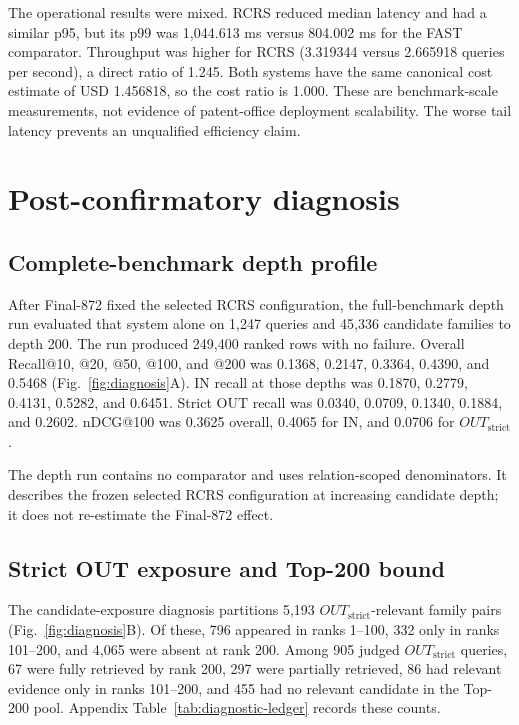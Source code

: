 \documentclass[final,5p,times,twocolumn]{elsarticle}
\newcommand{\RCRS}{RCRS}
\begin{document}
The operational results were mixed. \RCRS{} reduced median latency and had a
similar p95, but its p99 was 1,044.613 ms versus 804.002 ms for the FAST
comparator. Throughput was higher for \RCRS{} (3.319344 versus 2.665918 queries
per second), a direct ratio of 1.245. Both systems have the same canonical
cost estimate of USD 1.456818, so the cost ratio is 1.000. These are benchmark-scale
measurements, not evidence of patent-office deployment scalability. The worse
tail latency prevents an unqualified efficiency claim.

\section{Post-confirmatory diagnosis}

\subsection{Complete-benchmark depth profile}

After Final-872 fixed the selected RCRS configuration, the full-benchmark depth run evaluated that
system alone on 1,247 queries and 45,336 candidate families to depth 200. The run
produced 249,400 ranked rows with no failure. Overall Recall@10, @20, @50,
@100, and @200 was 0.1368, 0.2147,
0.3364, 0.4390, and 0.5468 (Fig.~\ref{fig:diagnosis}A). IN recall at those
depths was 0.1870, 0.2779, 0.4131, 0.5282, and 0.6451. Strict OUT recall was
0.0340, 0.0709, 0.1340, 0.1884, and 0.2602. nDCG@100 was 0.3625 overall,
0.4065 for IN, and 0.0706 for \ensuremath{OUT_{\mathrm{strict}}}.

The depth run contains no comparator and uses relation-scoped denominators. It describes
the frozen selected RCRS configuration at increasing candidate depth; it does not re-estimate the
Final-872 effect.

\subsection{Strict OUT exposure and Top-200 bound}

The candidate-exposure diagnosis partitions 5,193 \ensuremath{OUT_{\mathrm{strict}}}-relevant family pairs
(Fig.~\ref{fig:diagnosis}B). Of these, 796 appeared in ranks 1--100, 332 only
in ranks 101--200, and 4,065 were absent at rank 200. Among 905 judged
\ensuremath{OUT_{\mathrm{strict}}}
queries, 67 were fully retrieved by rank 200, 297 were partially retrieved,
86 had relevant evidence only in ranks 101--200, and 455 had no relevant
candidate in the Top-200 pool. Appendix Table~\ref{tab:diagnostic-ledger}
records these counts.
\end{document}
